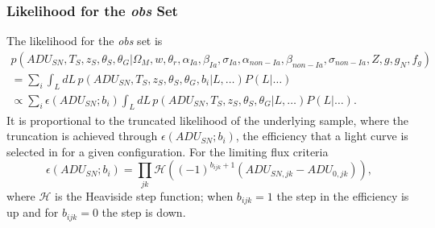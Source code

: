 \documentclass[preprint,3p]{elsarticle}
\begin{document}
\subsubsection{Likelihood for the {\it obs} Set}
The likelihood for the {\it obs} set is
\begin{multline}
p(\mathit{ADU}_{SN}, {{T}}_S,{{z}}_S, \theta_{S}, \theta_G |  \Omega_M, w, \theta_r, \alpha_{Ia}, \beta_{Ia},\sigma_{Ia}, \alpha_{\mathit{non-Ia}},\beta_{\mathit{non-Ia}}, \sigma_{\mathit{non-Ia}},  Z, g, g_N, f_g)\\
= \sum_i \int_L dL\, p(\mathit{ADU}_{SN}, {{T}}_S,{{z}}_S, \theta_{S}, \theta_G , b_i|  L, \ldots)
 P(L|\ldots) \\
 \propto \sum_i  \epsilon(\mathit{ADU}_{SN}; b_{i}) \int_L dL\, p(\mathit{ADU}_{SN}, {{T}}_S,{{z}}_S, \theta_{S}, \theta_G|  L, \ldots)P(L|\ldots).
\end{multline} 
It is proportional to the truncated likelihood of the underlying sample, where the truncation
is achieved through $\epsilon(\mathit{ADU}_{SN}; b_{i})$, the efficiency that a light curve is 
selected in for a given configuration.  For the limiting flux criteria
\begin{equation}
\epsilon(\mathit{ADU}_{SN}; b_{i})= \prod_{jk}\mathcal{H}\left((-1)^{b_{ijk}+1}(ADU_{SN,jk}-ADU_{0,jk})\right),
\end{equation}
where $\mathcal{H}$ is the Heaviside step function; when $b_{ijk}=1$ the step in the efficiency
is up and for $b_{ijk}=0$ the step is down.

%

%
\end{document}
